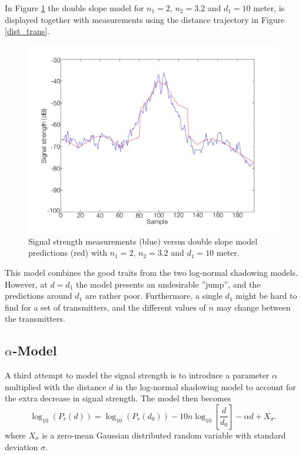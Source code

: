 \documentclass{LTHthesis}
\begin{document}
In Figure \ref{double_slope} the double slope model for $n_1=2$, $n_2=3.2$ and $d_1=10$ meter, is displayed together with measurements using the distance trajectory in Figure \ref{dist_trans}.
%
\begin{figure}[!hbt]

\includegraphics[width=1\textwidth ]{images/signal_model/double_slope}
\caption{Signal strength measurements (blue) versus double slope model predictions (red) with $n_1=2$, $n_2=3.2$ and $d_1=10$ meter.}\label{double_slope}
\end{figure}

This model combines the good traits from the two log-normal shadowing models. However, at $d=d_1$ the model presents an undesirable ''jump'', and the predictions around $d_1$ are rather poor. Furthermore, a single $d_1$ might be hard to find for a set of transmitters, and the different values of $n$ may change between the transmitters.
%
\subsection{$\alpha$-Model} %
%
A third attempt to model the signal strength is to introduce a parameter $\alpha$ multiplied with the distance $d$ in the log-normal shadowing model to account for the extra decrease in signal strength. \cite{karlsson92} The model then becomes
%
\begin{equation}
\log_{10}({P_r(d)})=\log_{10}({P_r(d_0)})-10n\log_{10}\left[{\frac{d}{d_0}}\right] - \alpha d+ X_\sigma.
\end{equation}
%
where $X_\sigma$ is a zero-mean Gaussian distributed random variable with standard deviation $\sigma$.
\end{document}
